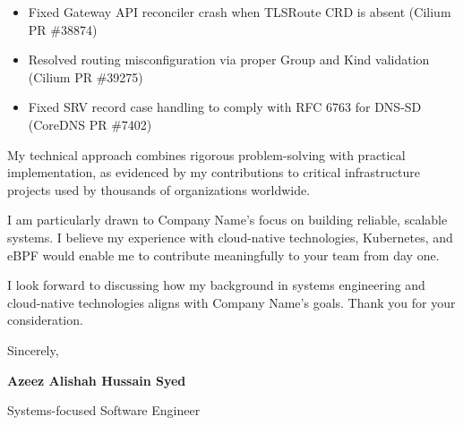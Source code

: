 \documentclass[10pt,letterpaper]{article}
\newcommand{\CompanyName}{Company Name}
\newcommand{\CompanyFocus}{building reliable, scalable systems}
\begin{document}
\begin{itemize}[nosep, leftmargin=*, topsep=2pt]
    \item Fixed Gateway API reconciler crash when TLSRoute CRD is absent (Cilium PR \#38874)
    \item Resolved routing misconfiguration via proper Group and Kind validation (Cilium PR \#39275)
    \item Fixed SRV record case handling to comply with RFC 6763 for DNS-SD (CoreDNS PR \#7402)
\end{itemize}

My technical approach combines rigorous problem-solving with practical implementation, as evidenced by my contributions to critical infrastructure projects used by thousands of organizations worldwide.

I am particularly drawn to \CompanyName's focus on \CompanyFocus. I believe my experience with cloud-native technologies, Kubernetes, and eBPF would enable me to contribute meaningfully to your team from day one.

I look forward to discussing how my background in systems engineering and cloud-native technologies aligns with \CompanyName's goals. Thank you for your consideration.

\vspace{12pt}

\noindent Sincerely,

\vspace{6pt}

\noindent\textbf{Azeez Alishah Hussain Syed}

{\small Systems-focused Software Engineer}
\end{document}
